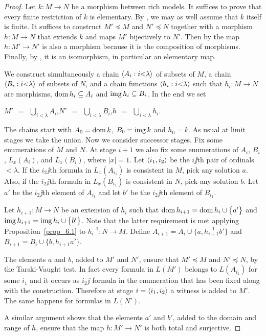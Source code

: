 \documentclass[creche.tex]{subfiles}
\begin{document}
\begin{proof}
Let $k:M\to N$ be a morphism between rich models. It suffices to prove that every finite restriction of $k$ is elementary. By , we may as well assume that $k$ itself is finite. It suffices to construct $M'\preceq M$ and  $N'\preceq N$ together with a morphism $h:M\to N$ that extends $k$ and maps $M'$ bijectively to $N'$. Then by  the map $h:M'\to N'$ is also a morphism because it is the composition of morphisms. Finally, by , it is an isomorphism, in particular an elementary map.

We construct simultaneously a chain $\langle A_i:i{<}\lambda\rangle$ of subsets of $M$, a chain $\langle B_i:i{<}\lambda\rangle$ of subsets of $N$, and a chain functions $\langle h_i:i{<}\lambda\rangle$ such that $h_i:M\to N$ are mor\-phisms, $\mathop{\rm dom} h_i\subseteq A_i$ and $\mathop{\rm img} h_i\subseteq B_i$. In the end we set

\hfil $\displaystyle M'\ \ =\ \ \bigcup_{i<\lambda}A_i$,\hfil $\displaystyle N'\ \ =\ \ \bigcup_{i<\lambda}B_i$,\hfil  $\displaystyle h\ \ =\ \ \bigcup_{i<\lambda}h_i$.

The chains start with $A_0=\mathop{\rm dom} k$, $B_0=\mathop{\rm img} k$ and $h_0=k$. As usual at limit stages we take the union. Now we consider successor stages. Fix some enumerations of $M$ and $N$. At stage $i+1$ we also fix some enumerations of $A_i$, $B_i$, $L_x(A_i)$, and $L_x(B_i)$, where $|x|=1$. Let $\langle i_1,i_2\rangle$ be the $i\jj$th pair of ordinals $<\lambda$. If the $i_2\jj$th formula in $L_x(A_{i_1})$ is consistent in $M$, pick any solution $a$. Also, if the $i_2\jj$th formula in $L_x(B_{i_1})$ is consistent in $N$, pick any solution $b$. Let $a'$ be the $i_2\jj$th element of $A_{i_1}$ and let $b'$ be the $i_2\jj$th element of $B_{i_1}$. 

Let $h_{i+1}:M\to N$ be an extension of $h_i$ such that $\mathop{\rm dom} h_{i+1}=\mathop{\rm dom} h_i\cup\big\{a'\big\}$ and $\mathop{\rm img} h_{i+1}=\mathop{\rm img} h_i\cup\big\{b'\big\}$. Note that the latter requirement is met applying Proposition~\ref{prop_6.1} to $h_i^{-1}:N\to M$. Define $A_{i+1}=A_i\cup\big\{a,h_{i+1}^{-1}b'\big\}$ and $B_{i+1}=B_i\cup\big\{b,h_{i+1}a'\big\}$.

The elements $a$ and $b$, added to $M'$ and $N'$, ensure that $M'\preceq M$ and $N'\preceq N$, by the Tarski-Vaught test. In fact every formula in $L(M')$ belongs to $L(A_{i_1})$ for some $i_1$ and it occurs as $i_2\jj$ formula in the enumeration that has been fixed along with the construction. Therefore at stage $i=\langle i_1,i_2\rangle$ a witness is added to $M'$. The same happens for formulas in $L(N')$. 

A similar argument shows that the elements $a'$ and $b'$, added to the domain and range of $h$, ensure that the map $h:M'\to N'$ is both total and surjective. 
\end{proof}
\end{document}
